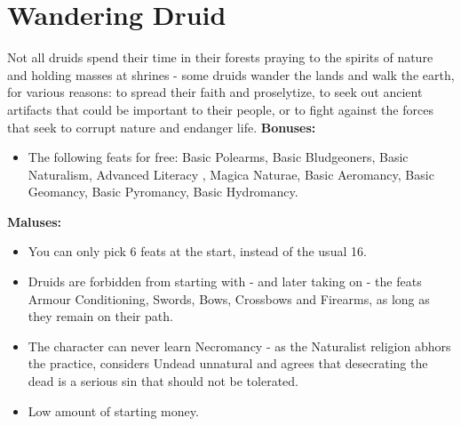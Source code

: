 \section{Wandering Druid}
Not all druids spend their time in their forests praying to the spirits of nature and holding masses at shrines - some druids wander the lands and walk the earth, for various reasons: to spread their faith and proselytize, to seek out ancient artifacts that could be important to their people, or to fight against the forces that seek to corrupt nature and endanger life.\newline
\textbf{Bonuses:}
\begin{itemize}
	\item The following feats for free: Basic Polearms, Basic Bludgeoners, Basic Naturalism, Advanced Literacy , Magica Naturae, Basic Aeromancy, Basic Geomancy, Basic Pyromancy, Basic Hydromancy.
\end{itemize}
\textbf{Maluses:}
\begin{itemize}
	\item You can only pick 6 feats at the start, instead of the usual 16.
	\item Druids are forbidden from starting with - and later taking on - the feats Armour Conditioning, Swords, Bows, Crossbows and Firearms, as long as they remain on their path.
	\item The character can never learn Necromancy - as the Naturalist religion abhors the practice, considers Undead unnatural and agrees that desecrating the dead is a serious sin that should not be tolerated.
	\item Low amount of starting money.
\end{itemize}
